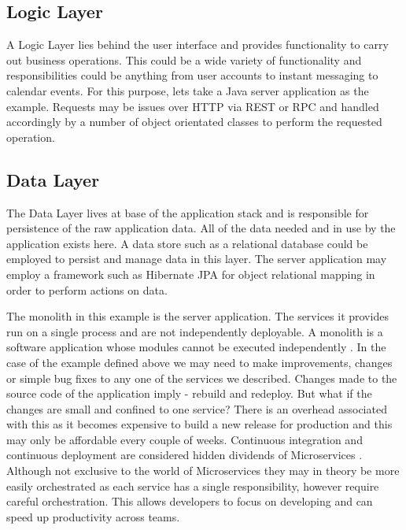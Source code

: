 \subsection{Logic Layer}
A Logic Layer lies behind the user interface and provides functionality to carry out business operations. This could be a wide variety of functionality and responsibilities could be anything from user accounts to instant messaging to calendar events. For this purpose, lets take a Java server application as the example. Requests may be issues over HTTP via REST\cite{Fielding:2000:ASD:932295} or RPC and handled accordingly by a number of object orientated classes to perform the requested operation.

\subsection{Data Layer}
The Data Layer lives at base of the application stack and is responsible for persistence of the raw application data. All of the data needed and in use by the application exists here. A data store such as a relational database could be employed to persist and manage data in this layer. The server application may employ a framework such as Hibernate\cite{JPAHibernate} JPA for object relational mapping in order to perform actions on data. 

The monolith in this example is the server application. The services it provides run on a single process and are not independently deployable. A monolith is a software application whose modules cannot be executed independently \cite{MicroservicesYesterdayTodayTomorrow}. In the case of the example defined above we may need to make improvements, changes or simple bug fixes to any one of the services we described. Changes made to the source code of the application imply - rebuild and redeploy. But what if the changes are small and confined to one service? There is an overhead associated with this as it becomes expensive to build a new release for production and this may only be affordable every couple of weeks. Continuous integration and continuous deployment are considered hidden dividends of Microservices \cite{hiddendividends}. Although not exclusive to the world of Microservices they may in theory be more easily orchestrated as each service has a single responsibility, however require careful orchestration. This allows developers to focus on developing and can speed up productivity across teams. 

